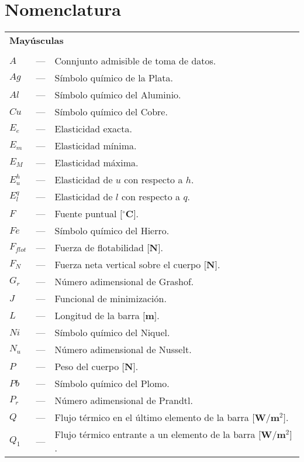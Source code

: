\chapter*{Nomenclatura}

\begin{longtable}{p{5mm} c p{120mm} }
%
\multicolumn{3}{l}{\textbf{May\'usculas} }\\
\\
$A$ & --- & Connjunto admisible de toma de datos.\\
$Ag$ & --- & S\'imbolo qu\'imico de la Plata.\\
$Al$ & --- & S\'imbolo qu\'imico del Aluminio.\\
$Cu$ & --- & S\'imbolo qu\'imico del Cobre.\\
$E_e$ & --- & Elasticidad exacta.\\
$E_m$ & --- & Elasticidad m\'inima.\\
$E_M$ & --- & Elasticidad m\'axima.\\
$E_{u}^{h}$ & --- & Elasticidad de $u$ con respecto a $h$.\\
$E_{l}^{q}$ & --- & Elasticidad de $l$ con respecto a $q$.\\
$F$ & --- & Fuente puntual $\textbf{[{$^{\circ}$}C]}$.\\
$Fe$ & --- & S\'imbolo qu\'imico del Hierro.\\
$F_{flot}$ & --- & Fuerza de flotabilidad $\textbf{[N]}$.\\
$F_N$ & --- & Fuerza neta vertical sobre el cuerpo $\textbf{[N]}$.\\
$G_r$ & --- & N\'umero adimensional de Grashof.\\
$J$ & --- & Funcional de minimizaci\'on.\\
$L$ & --- & Longitud de la barra $\textbf{[m]}$.\\
$Ni$ & --- & S\'imbolo qu\'imico del Niquel.\\
$N_u$ & --- & N\'umero adimensional de Nusselt.\\
$P$ & --- & Peso del cuerpo $\textbf{[N]}$.\\
$Pb$ & --- & S\'imbolo qu\'imico del Plomo.\\
$P_r$ & --- & N\'umero adimensional de Prandtl.\\
$Q$ & --- & Flujo t\'ermico en el \'ultimo elemento de la barra $\textbf{[W/m{$^{2}$}]}$.\\
$Q_1$ & --- & Flujo t\'ermico entrante a un elemento de la barra $\textbf{[W/m{$^{2}$}]}$.\\

\end{longtable}
